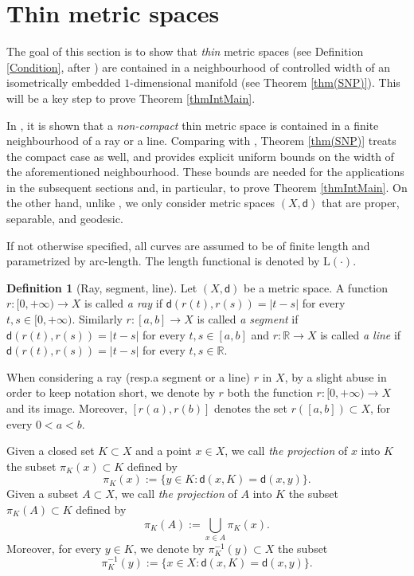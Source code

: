 \documentclass[10pt]{article}
\theoremstyle{definition}
\newtheorem{definition}[thm]{Definition}
\newcommand{\bb}[1]{\mathbb{#1}}
\newcommand{\length}{\mathrm{L}}
\newcommand{\sd}{\mathsf{d}}
\begin{document}
\section{Thin metric spaces} \label{S1}

The goal of this section is to show that \emph{thin} metric spaces (see Definition \ref{Condition}, after \cite{TrianglesKapo}) are contained in a neighbourhood of controlled width of an isometrically embedded $1$-dimensional manifold (see Theorem \ref{thm(SNP)}). This will be a key step to prove Theorem \ref{thmIntMain}.

In \cite[Section 5] {TrianglesKapo}, it is shown that a \emph{non-compact} thin metric space is contained in a finite neighbourhood of a ray or a line. Comparing with \cite[Section 5] {TrianglesKapo}, Theorem \ref{thm(SNP)} treats the compact case as well, and provides explicit uniform bounds on the width of the aforementioned neighbourhood. These bounds are needed for the applications in the subsequent sections and, in particular, to prove Theorem \ref{thmIntMain}.
On the other hand, unlike \cite[Section 5] {TrianglesKapo}, we only consider metric spaces $(X,\sd)$ that are proper, separable, and geodesic.

If not otherwise specified, all curves are assumed to be of finite length and parametrized by arc-length. The length functional is denoted by $\length(\cdot)$.

\begin{definition}[Ray, segment, line]
    Let $(X,\sd)$ be a metric space. A function $r:[0,+\infty) \to X$ is called  \emph{a ray} if
    $
    \sd(r(t),r(s))=|t-s|
    $
    for every $t,s \in [0,+\infty)$.
    Similarly $r:[a,b] \to X$ is called \emph{a segment} if
    $
    \sd(r(t),r(s))=|t-s|
    $
    for every $t,s \in [a,b]$ and  $r:\bb{R} \to X$ is called  \emph{a line} if
    $
    \sd(r(t),r(s))=|t-s|
    $
    for every $t,s \in \bb{R}$.
\end{definition}

When considering a ray (resp.\;a segment or a line) $r$ in $X$, by a slight abuse in order to keep notation short, we denote by $r$ both the function $r:[0,+\infty) \to X$ and its image. Moreover,  $[r(a),r(b)]$ denotes the set $r([a,b]) \subset X$,  for every $0<a<b$.

Given a closed set $K \subset X$ and a point $x\in X$, we call \emph{the projection} of $x$ into $K$ the subset $\pi_{K}(x)\subset K$ defined by
$$
\pi_{K}(x):=\{y\in K\colon \sd(x, K)=\sd(x,y)\}.
$$
Given a subset $A \subset X$, we call \emph{the projection} of $A$ into $K$ the subset $\pi_{K}(A)\subset K$ defined by
\[
\pi_K(A):=\bigcup_{x \in A} \pi_K(x).
\]
Moreover, for every $y \in K$, we denote by $\pi^{-1}_K(y) \subset X$ the subset
\begin{equation}\label{D3}
\pi^{-1}_K(y):=\{x\in X\colon \sd(x,K)=\sd(x,y)\}.
\end{equation}
\end{document}
